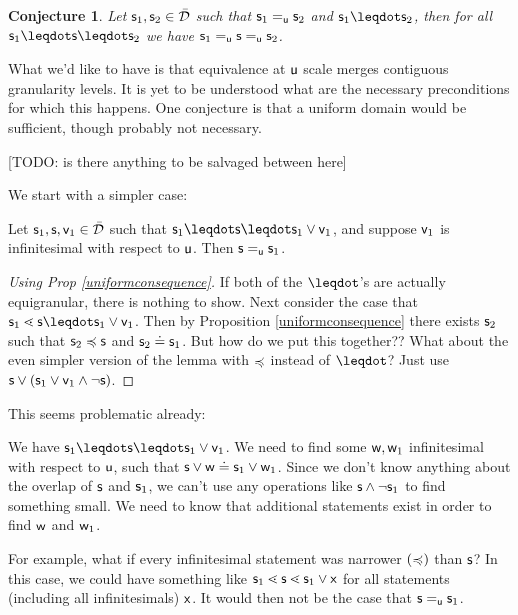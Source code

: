 \documentclass[10pt, onecolumn, nofootinbib]{revtex4-1}
\newtheorem{conj}[equation]{Conjecture}
\begin{document}
\begin{conj}
	Let $\stmt_1, \stmt_2 \in \tdomain$ such that $\stmt_1 \equ \stmt_2$ and $\stmt_1 \finer \stmt_2$, then for all $\stmt_1 \finer \stmt \finer \stmt_2$ we have $\stmt_1 \equ \stmt \equ \stmt_2$.
\end{conj}

\begin{remark}
	What we'd like to have is that equivalence at $\stmt[u]$ scale merges contiguous granularity levels. It is yet to be understood what are the necessary preconditions for which this happens. One conjecture is that a uniform domain would be sufficient, though probably not necessary.
\end{remark}

[TODO: is there anything to be salvaged between here]

We start with a simpler case:

\begin{prop}
	Let $\stmt_1,\stmt,\stmt[v]_1\in\tdomain$ such that $\stmt_1\finer\stmt\finer\stmt_1\OR\stmt[v]_1$, and suppose $\stmt[v]_1$ is infinitesimal with respect to $\stmt[u]$. Then $\stmt\equ\stmt_1$. 
\end{prop}
\begin{proof}[Using Prop \ref{uniformconsequence}]
	If both of the $\finer$'s are actually equigranular, there is nothing to show. Next consider the case that $\stmt_1\sfiner\stmt\finer\stmt_1\OR\stmt[v]_1$. Then by Proposition \ref{uniformconsequence} there exists $\stmt_2$ such that $\stmt_2\narrower\stmt$ and $\stmt_2\eqgran\stmt_1$. But how do we put this together?? What about the even simpler version of the lemma with $\narrower$ instead of $\finer$? Just use $\stmt\OR (\stmt_1\OR\stmt[v]_1 \AND \NOT\stmt)$.
\end{proof}

This seems problematic already:

We have $\stmt_1\finer\stmt\finer\stmt_1\OR\stmt[v]_1$. We need to find some $\stmt[w],\stmt[w]_1$ infinitesimal with respect to $\stmt[u]$, such that $\stmt\OR\stmt[w]\eqgran\stmt_1\OR\stmt[w]_1$. Since we don't know anything about the overlap of $\stmt$ and $\stmt_1$, we can't use any operations like $\stmt\AND\NOT\stmt_1$ to find something small. We need to know that additional statements exist in order to find $\stmt[w]$ and $\stmt[w]_1$. 

For example, what if every infinitesimal statement was narrower $(\narrower)$ than $\stmt$? In this case, we could have something like $\stmt_1\sfiner\stmt\sfiner\stmt_1\OR\stmt[x]$ for all statements (including all infinitesimals) $\stmt[x]$. It would then not be the case that $\stmt\equ\stmt_1$. 
\end{document}
